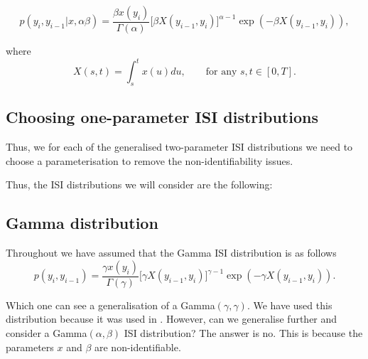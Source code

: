 \documentclass[../main.tex]{subfiles}
\begin{document}
\begin{equation}
 p(y_i, y_{i-1}| x, \alpha \beta) =  \frac{\beta x(y_i)}{\Gamma ( \alpha )} \big[ \beta X(y_{i-1} , y_i ) \big]^{\alpha -1} \exp( - \beta X(y_{i-1} , y_i )  ),
 \end{equation}
 
 where 
  \begin{equation}
X(s,t) = \int^{t}_{s} x(u) du , \qquad \text{for any } s,t \in [0,T].
\end{equation}


 
\subsection{Choosing one-parameter ISI distributions}
Thus, we for each of the generalised two-parameter ISI distributions we need to choose a parameterisation to remove the non-identifiability issues. 

Thus, the ISI distributions we will consider are the following:

\subsection{Gamma distribution}
Throughout we have assumed that the Gamma ISI distribution is as follows 
\begin{equation}
 p(y_i, y_{i-1}) =  \frac{\gamma x(y_i)}{\Gamma ( \gamma )} \big[ \gamma X(y_{i-1} , y_i ) \big]^{\gamma -1} \exp( - \gamma X(y_{i-1} , y_i )  ).
 \end{equation}
 
 Which one can see a generalisation of a Gamma$(\gamma,\gamma)$. We have used this distribution because it was used in \cite{}. However, can we generalise further and consider a Gamma$(\alpha,\beta)$ ISI distribution? The answer is no. This is because the parameters $x$ and $\beta$ are non-identifiable.  \\
 
\end{document}

